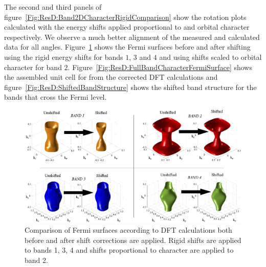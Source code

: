 The second and third panels of figure~\ref{Fig:ResD:Band2DCharacterRigidComparison} show the rotation plots calculated with the energy shifts applied proportional to \DzTwo{} and \DxzDyz{} orbital character respectively. We observe a much better alignment of the measured and calculated data for all angles. Figure~\ref{Fig:ResD:BandCharacterFSShiftComparison} shows the Fermi surfaces before and after shifting using the rigid energy shifts for bands $1$, $3$ and $4$ and using shifts scaled to \DzTwo{} orbital character for band $2$. Figure~\ref{Fig:ResD:FullBandCharacterFermiSurface} shows the assembled unit cell for \BaFeP{} from the corrected \ac{DFT} calculations and figure~\ref{Fig:ResD:ShiftedBandStructure} shows the shifted band structure for the bands that cross the Fermi level.
\begin{figure}[htbp]
    \begin{center}
        \includegraphics[scale=0.8]{Chapter-dHvABaFe2P2/Figures/AngleDepMeasurements/BandCharacterFermiSurface/BandCharacterFermiSurfaceShiftComparison}
        \caption{Comparison of Fermi surfaces according to \ac{DFT} calculations both before and after shift corrections are applied. Rigid shifts are applied to bands 1, 3, 4 and shifts proportional to \DzTwo{} character are applied to band 2.}
        \label{Fig:ResD:BandCharacterFSShiftComparison}
    \end{center}
\end{figure}
